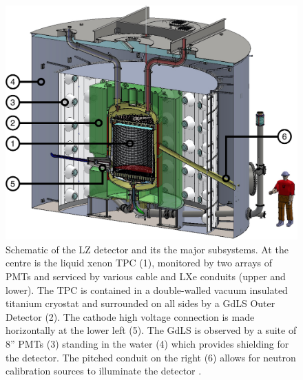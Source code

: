 \begin{figure}[!ht]
    \centering
    \includegraphics[width=\linewidth]{figures/LZ/LZSchematic.pdf}
    \caption[Schematic of the LZ detector and its the major subsystems.]{Schematic of the LZ detector and its the major subsystems. At the centre is the liquid xenon TPC (1), monitored by two arrays of PMTs and serviced by various cable and LXe conduits (upper and lower). The TPC is contained in a double-walled vacuum insulated titanium cryostat and surrounded on all sides by a GdLS Outer Detector (2). The cathode high voltage connection is made horizontally at the lower left (5). The GdLS is observed by a suite of 8” PMTs (3) standing in the water (4) which provides shielding for the detector. The pitched conduit on the right (6) allows for neutron calibration sources to illuminate the detector \cite{LZNIMA}.}
    \label{fig:LZ/LZDetector}
\end{figure}
